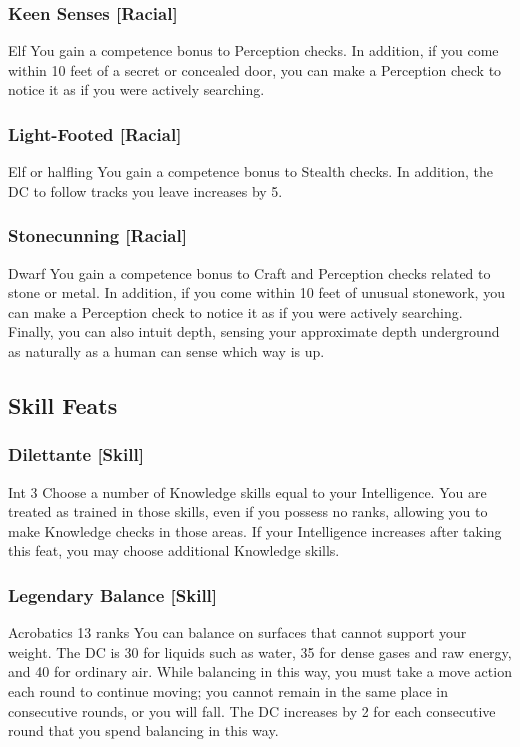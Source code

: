 \subsubsection{Keen Senses [Racial]}
 Elf
 You gain a  competence bonus to Perception checks. In addition, if you come within 10 feet of a secret or concealed door, you can make a Perception check to notice it as if you were actively searching.

\subsubsection{Light-Footed [Racial]}
 Elf or halfling
 You gain a  competence bonus to Stealth checks. In addition, the DC to follow tracks you leave increases by 5.

\subsubsection{Stonecunning [Racial]}
 Dwarf
 You gain a  competence bonus to Craft and Perception checks related to stone or metal. In addition, if you come within 10 feet of unusual stonework, you can make a Perception check to notice it as if you were actively searching. Finally, you can also intuit depth, sensing your approximate depth underground as naturally as a human can sense which way is up.

\subsection{Skill Feats}

\subsubsection{Dilettante [Skill]}
 Int 3
 Choose a number of Knowledge skills equal to your Intelligence. You are treated as trained in those skills, even if you possess no ranks, allowing you to make Knowledge checks in those areas. If your Intelligence increases after taking this feat, you may choose additional Knowledge skills.

\subsubsection{Legendary Balance [Skill]}
\featpre Acrobatics 13 ranks
\featben You can balance on surfaces that cannot support your weight. The DC is 30 for liquids such as water, 35 for dense gases and raw energy, and 40 for ordinary air. While balancing in this way, you must take a move action each round to continue moving; you cannot remain in the same place in consecutive rounds, or you will fall. The DC increases by 2 for each consecutive round that you spend balancing in this way.

